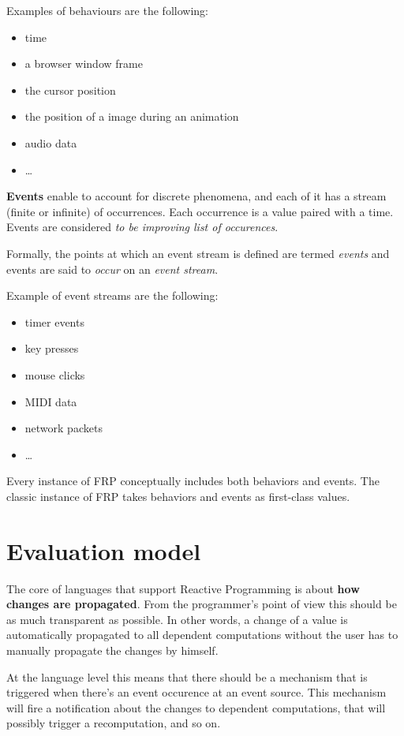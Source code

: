 Examples of behaviours are the following:

\begin{itemize}
\itemsep1pt\parskip0pt
\item
  time
\item
  a browser window frame
\item
  the cursor position
\item
  the position of a image during an animation
\item
  audio data
\item
  \ldots{}
\end{itemize}

\textbf{Events} enable to account for discrete phenomena, and each of it
has a stream (finite or infinite) of occurrences. Each occurrence is a
value paired with a time. Events are considered \emph{to be improving
list of occurences}.

Formally, the points at which an event stream is defined are termed
\emph{events} and events are said to \emph{occur} on an \emph{event
stream}.

Example of event streams are the following:

\begin{itemize}
\itemsep1pt\parskip0pt
\item
  timer events
\item
  key presses
\item
  mouse clicks
\item
  MIDI data
\item
  network packets
\item
  \ldots{}
\end{itemize}

Every instance of FRP conceptually includes both behaviors and events.
The classic instance of FRP takes behaviors and events as first-class
values.

\section{Evaluation model}\label{evaluation-model}

The core of languages that support Reactive Programming is about
\textbf{how changes are propagated}. From the programmer's point of view
this should be as much transparent as possible. In other words, a change
of a value is automatically propagated to all dependent computations
without the user has to manually propagate the changes by himself.

At the language level this means that there should be a mechanism that
is triggered when there's an event occurence at an event source. This
mechanism will fire a notification about the changes to dependent
computations, that will possibly trigger a recomputation, and so on.

